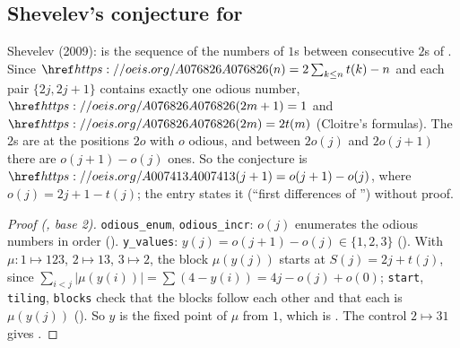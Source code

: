 \subsection{Shevelev's conjecture for }\label{s:A007413}
Shevelev (2009):  is the sequence of the numbers of $1$s between consecutive $2$s of
. Since $\oeis{A076826}(n)=2\sum_{k\le n}t(k)-n$ and each pair $\{2j,2j+1\}$ contains exactly one
odious number, $\oeis{A076826}(2m+1)=1$ and $\oeis{A076826}(2m)=2t(m)$ (Cloitre's formulas). The $2$s are at the
positions $2o$ with $o$ odious, and between $2o(j)$ and $2o(j+1)$ there are $o(j+1)-o(j)$ ones. So the
conjecture is $\oeis{A007413}(j+1)=o(j+1)-o(j)$, where $o(j)=2j+1-t(j)$; the entry states it (``first
differences of '') without proof.
\begin{proof}[Proof (\Walnut, base 2)] \texttt{odious\_enum}, \texttt{odious\_incr}: $o(j)$ enumerates the
odious numbers in order (\TRUE). \texttt{y\_values}: $y(j)=o(j+1)-o(j)\in\{1,2,3\}$ (\TRUE). With
$\mu:1\mapsto123$, $2\mapsto13$, $3\mapsto2$, the block $\mu(y(j))$ starts at $S(j)=2j+t(j)$, since
$\sum_{i<j}|\mu(y(i))|=\sum(4-y(i))=4j-o(j)+o(0)$; \texttt{start}, \texttt{tiling}, \texttt{blocks} check that the
blocks follow each other and that each is $\mu(y(j))$ (\TRUE). So $y$ is the fixed point of $\mu$ from $1$,
which is . The control $2\mapsto31$ gives \FALSE. \end{proof}

